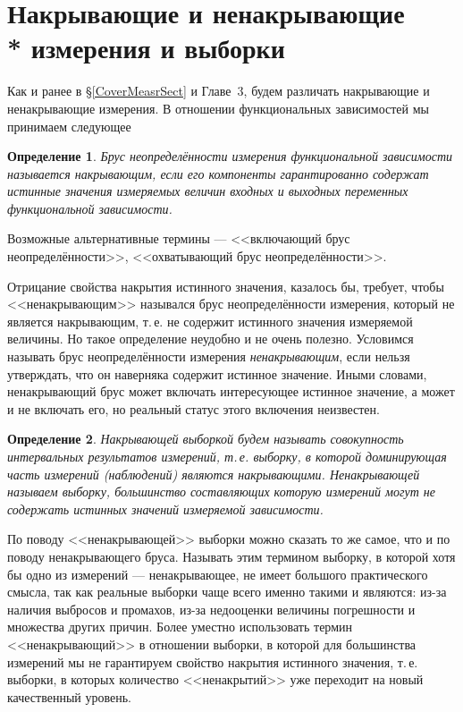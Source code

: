 \documentclass[a5paper,openany]{book}
\newtheorem{definition}{Определение}[section]
\begin{document}
  
  
\section[Накрывающие и ненакрывающие измерения и выборки]%
        {Накрывающие и ненакрывающие \\* измерения и выборки} 
\label{CoverNCoverSect} 
  
  
Как и ранее в \S\ref{CoverMeasrSect} и Главе~3, будем различать накрывающие и 
ненакрывающие измерения. В отношении функциональных зависимостей мы принимаем следующее 
  
\begin{definition} 
Брус неопределённости измерения функциональной зависимости называется \textsl{накрывающим}, 
если его компоненты гарантированно содержат истинные значения измеряемых величин входных 
и выходных переменных функциональной зависимости.        
\end{definition} 
  
Возможные альтернативные термины --- <<включающий брус неопределённости>>, 
<<охватывающий брус неопределённости>>.  
   
Отрицание свойства накрытия истинного значения, казалось бы, требует, чтобы  
<<ненакрывающим>> назывался брус неопределённости измерения, который не является 
накрывающим, т.\,е. не содержит истинного значения измеряемой величины. Но такое 
определение неудобно и не очень полезно. Условимся называть брус неопределённости 
измерения \emph{ненакрывающим}, если нельзя утверждать, что он наверняка содержит 
истинное значение. Иными словами, ненакрывающий брус может включать интересующее 
истинное значение, а может и не включать его, но реальный статус этого включения 
неизвестен.         
  
\begin{definition}   
\textsl{Накрывающей выборкой} будем называть совокупность интервальных результатов 
измерений, т.\,е. выборку, в которой доминирующая часть 
измерений (наблюдений) являются накрывающими. \textsl{Ненакрывающей} называем 
выборку, большинство составляющих которую измерений могут не содержать истинных 
значений измеряемой зависимости. 
\end{definition} 
    
По поводу <<ненакрывающей>> выборки можно сказать то же самое, что и по поводу 
ненакрывающего бруса. Называть этим термином выборку, 
в которой хотя бы одно из измерений --- ненакрывающее, не имеет большого практического 
смысла, так как реальные выборки чаще всего именно такими и являются: из-за наличия 
выбросов и промахов, из-за недооценки величины погрешности и множества других причин. 
Более уместно использовать термин <<ненакрывающий>> в отношении выборки, в которой  
для большинства измерений мы не гарантируем свойство накрытия истинного значения, 
т.\,е. выборки, в которых количество <<ненакрытий>> уже переходит на новый 
качественный уровень.  
  
\end{document}
